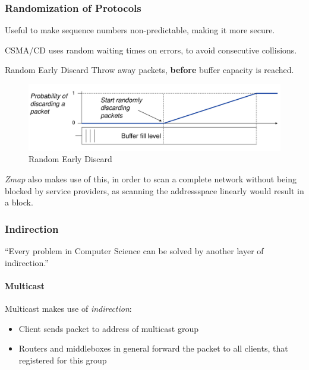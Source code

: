 \documentclass[english]{panikzettel}
\begin{document}
	\subsubsection{Randomization of Protocols}
	\label{sss-randomization-of-protocols}
	
	Useful to make sequence numbers non-predictable, making it more secure.

	CSMA/CD uses random waiting times on errors, to avoid consecutive collisions.

	\begin{defi}{Random Early Discard}
		Throw away packets, \textbf{before} buffer capacity is reached.
		\begin{figure}[H]
			\centering
			\includegraphics[width=\textwidth]{img/2-red.png}
			\caption{Random Early Discard}
			\label{img-2-red}
		\end{figure}
	\end{defi}
	
	\textit{Zmap} also makes use of this, in order to scan a complete network without being blocked by service providers, as scanning the addressspace linearly would result in a block.

	\subsubsection{Indirection}
	\label{sss-indirection}
	
	\begin{center}
		\enquote{Every problem in Computer Science can be solved by another layer of indirection.}
	\end{center}

	\paragraph{Multicast}
	\label{pgf-multicast}
	
	Multicast makes use of \textit{indirection}:
	\begin{itemize}
		\item Client sends packet to address of multicast group
		\item Routers and middleboxes in general forward the packet to all clients, that registered for this group
	\end{itemize}
\end{document}
